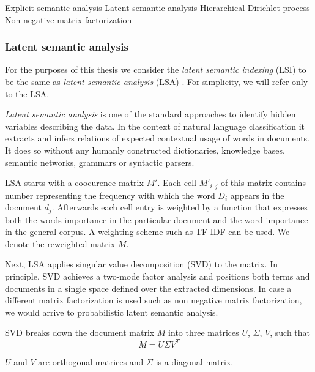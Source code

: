     Explicit semantic analysis
    Latent semantic analysis
    Hierarchical Dirichlet process
    Non-negative matrix factorization
    
    
    \subsubsection{Latent semantic analysis} \label{sec:lsa}
    
    For the purposes of this thesis we consider the \emph{latent semantic indexing} (LSI) to be the same as \emph{latent semantic analysis} (LSA) \cite{deerwester1990indexing}.
    For simplicity, we will refer only to the LSA.
    
    \emph{Latent semantic analysis} is one of the standard approaches to identify hidden variables describing the data.
    In the context of natural language classification it extracts and infers relations of expected contextual usage of words in documents.
    It does so without any humanly constructed dictionaries, knowledge bases, semantic networks, grammars or syntactic parsers.
    
    LSA starts with a coocurence matrix $M'$. 
    Each cell $M'_{i,j}$ of this matrix contains number representing the frequency with  which  the  word $D_i$ appears in the document $d_j$.
    Afterwards each cell entry is weighted by a function that expresses both the words importance in the particular document and the word importance in the general corpus.
    A weighting scheme such as TF-IDF can be used.
    We denote the reweighted matrix $M$. 
    
    Next, LSA applies singular value decomposition (SVD) to the matrix.
    In principle, SVD achieves a two-mode factor analysis and positions both terms and documents in a single space defined over the extracted dimensions.
    In case a different matrix factorization is used such as non negative matrix factorization, we would arrive to probabilistic latent semantic analysis.
    
    SVD breaks down the document matrix $M$ into three matrices $U$, $\Sigma$, $V$,\cite{papadimitriou2000latent} %
    \cite{maas2011learning} %
    \cite{wiemer2004latent} %
    \cite{landauer1998introduction} %
    such that $$M=U \Sigma V^T$$ 

    $U$ and $V$ are orthogonal matrices and $\Sigma$ is a diagonal matrix.
    
